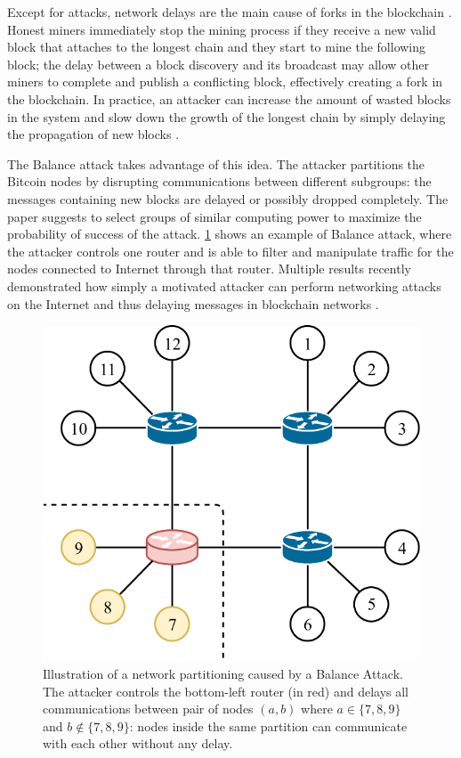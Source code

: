Except for attacks, network delays are the main cause of forks in the blockchain \cite{information_propagation_2013}.
Honest miners immediately stop the mining process if they receive a new valid block that attaches to the longest chain and they start to mine the following block;
the delay between a block discovery and its broadcast may allow other miners to complete and publish a conflicting block, effectively creating a fork in the blockchain.
In practice, an attacker can increase the amount of wasted blocks in the system and slow down the growth of the longest chain by simply delaying the propagation of new blocks \cite{balance_attack_2017}.

\medskip
The Balance attack takes advantage of this idea.
The attacker partitions the Bitcoin nodes by disrupting communications between different subgroups:
the messages containing new blocks are delayed or possibly dropped completely.
The paper suggests to select groups of similar computing power to maximize the probability of success of the attack.
\cref{fig:balance} shows an example of Balance attack, where the attacker controls one router and is able to filter and manipulate traffic for the nodes connected to Internet through that router.
Multiple results recently demonstrated how simply a motivated attacker can perform networking attacks on the Internet and thus delaying messages in blockchain networks \cite{bgp_hijacking_secureworks, eclipse_attack_2015, hijacking_bitcoin_2017}.

\begin{figure}[h]
	\centering
	\vspace*{0.25cm}
	\includegraphics[scale=0.8]{figures/balance}
	\vspace*{0.25cm}
	\caption[Illustration of a network partitioning caused by a Balance Attack]{
		Illustration of a network partitioning caused by a Balance Attack.
		The attacker controls the bottom-left router (in red) and delays all communications between pair of nodes $(a, b)$ where $a \in \{7,8,9\}$ and $b \not \in \{7, 8, 9\}$:
		nodes inside the same partition can communicate with each other without any delay.
	}
	\label{fig:balance}
\end{figure}

